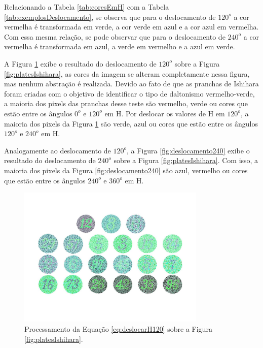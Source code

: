 \documentclass[	12pt, Times, openright, twoside, a4paper, english, brazil]{abntex2}
\begin{document}
Relacionando a Tabela \ref{tab:coresEmH} com a Tabela \ref{tab:exemplosDeslocamento}, se observa que para o deslocamento de $120^o$ a cor vermelha é transformada em verde, a cor verde em azul e a cor azul em vermelha. Com essa mesma relação, se pode observar que para o deslocamento de $240^o$ a cor vermelha é transformada em azul, a verde em vermelho e a azul em verde.

A Figura \ref{fig:deslocamento120} exibe o resultado do deslocamento de $120^o$  sobre a Figura \ref{fig:platesIshihara}, as cores da imagem se alteram completamente nessa figura, mas nenhum abstração é realizada. Devido ao fato de que as pranchas de Ishihara foram criadas com o objetivo de identificar o tipo de daltonismo vermelho-verde, a maioria dos pixels das pranchas desse teste são vermelho, verde ou cores que estão entre os ângulos $0^o$ e $120^o$ em H. Por deslocar os valores de H em $120^o$, a maioria dos pixels da Figura \ref{fig:deslocamento120} são verde, azul ou cores que estão entre os ângulos $120^o$ e $240^o$ em H.

Analogamente ao deslocamento de $120^o$, a Figura \ref{fig:deslocamento240} exibe o resultado do deslocamento de $240^o$ sobre a Figura \ref{fig:platesIshihara}. Com isso, a maioria dos pixels da Figura \ref{fig:deslocamento240} são azul, vermelho ou cores que estão entre os ângulos $240^o$ e $360^o$ em H.

\begin{figure}[!htb]
\centering \includegraphics[width=0.80\textwidth]{figuraDeslocar120.jpg}
\caption{Processamento da Equação \ref{eq:deslocarH120} sobre a Figura \ref{fig:platesIshihara}. \label{fig:deslocamento120}}
\end{figure}
\end{document}

